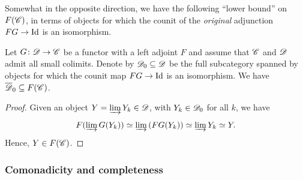 \documentclass[english]{article}
\begin{document}
Somewhat in the opposite direction, we have the following ``lower bound'' on $F(\mathscr{C})$, in terms of objects for which the counit of the \textit{original} adjunction $F G \to \mathrm{Id}$ is an isomorphism. 

\begin{prop}\label{Cmpl2Free}
    Let $G\colon \mathscr{D} \to \mathscr{C}$ be a functor with a left adjoint $F$ and assume that $\mathscr{C}$ and $\mathscr{D}$ admit all small colimits. Denote by $\mathscr{D}_0\subseteq \mathscr{D}$ be the full subcategory spanned by objects for which the counit map $F G \to \mathrm{Id}$ is an isomorphism. We have 
    $\overline{\mathscr{D}}_0 \subseteq F(\mathscr{C})$. 
\end{prop}
\begin{proof}
    Given an object $Y=\underrightarrow{\operatorname{lim}}\, Y_k \in \mathscr{D}$, with $Y_k \in \mathscr{D}_0$ for all $k$, we have 
    \[
        F(\underrightarrow{\operatorname{lim}}\, G (Y_k)) \simeq 
        \underrightarrow{\operatorname{lim}}\,(F G (Y_k)) \simeq
        \underrightarrow{\operatorname{lim}}\, Y_k \simeq Y.
    \]
    Hence, $Y \in F(\mathscr{C})$. 
\end{proof}

\subsubsection{Comonadicity and completeness}
\end{document}

